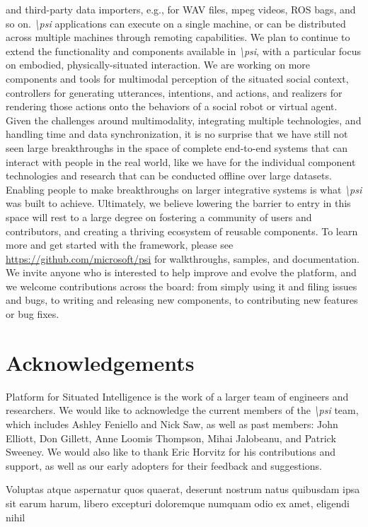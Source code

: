 \documentclass[letterpaper]{article} %
\newcommand{\psif}{\emph{\textbackslash psi} }
\newcommand{\psifnospace}{\emph{\textbackslash psi}}
\begin{document}
and third-party data importers, e.g., for WAV files, mpeg videos, ROS bags, and so on. \psif applications can execute on a single machine, or can be distributed across multiple machines through remoting capabilities.  We plan to continue to extend the functionality and components available in \psifnospace, with a particular focus on embodied, physically-situated interaction. We are working on more components and tools for multimodal perception of the situated social context, controllers for generating utterances, intentions, and actions, and realizers for rendering those actions onto the behaviors of a social robot or virtual agent.  Given the challenges around multimodality, integrating multiple technologies, and handling time and data synchronization, it is no surprise that we have still not seen large breakthroughs in the space of complete end-to-end systems that can interact with people in the real world, like we have for the individual component technologies and research that can be conducted offline over large datasets. Enabling people to make breakthroughs on larger integrative systems is what \psif was built to achieve. Ultimately, we believe lowering the barrier to entry in this space will rest to a large degree on fostering a community of users and contributors, and creating a thriving ecosystem of reusable components.  To learn more and get started with the framework, please see \textcolor{blue}{\url{https://github.com/microsoft/psi}} for walkthroughs, samples, and documentation. We invite anyone who is interested to help improve and evolve the platform, and we welcome contributions across the board: from simply using it and filing issues and bugs, to writing and releasing new components, to contributing new features or bug fixes.

\vspace{-3.02mm}
\section{Acknowledgements}
Platform for Situated Intelligence is the work of a larger team of engineers and researchers. We would like to acknowledge the current members of the \psif team, which includes Ashley Feniello and Nick Saw, as well as past members: John Elliott, Don Gillett, Anne Loomis Thompson, Mihai Jalobeanu, and Patrick Sweeney. We would also like to thank Eric Horvitz for his contributions and support, as well as our early adopters for their feedback and suggestions.

  Voluptas atque aspernatur quos quaerat, deserunt nostrum natus quibusdam ipsa sit earum harum, libero excepturi doloremque numquam odio ex amet, eligendi nihil

\end{document}
